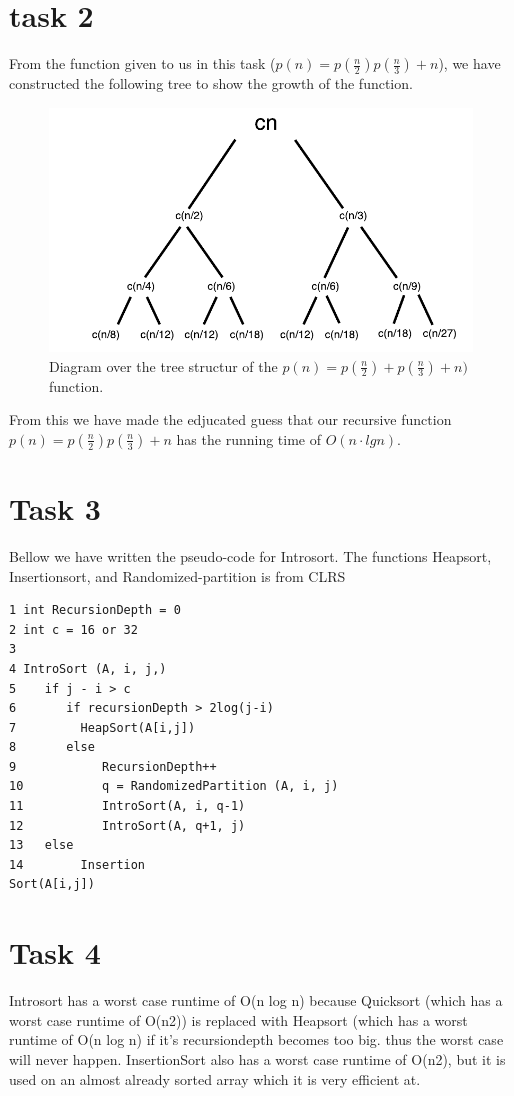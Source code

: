 \documentclass[12pt]{article}
\begin{document}
\section{task 2}
From the function given to us in this task ($p(n) = p(\frac{n}{2}) p(\frac{n}{3}) + n$), we have constructed the following tree to show the growth of the function.
\begin{figure}[!h]
 	\begin{center}
	\includegraphics[scale=1]{include/Tree_diagram}
	\end{center}
	\caption{Diagram over the tree structur of the $p(n) = p(\frac{n}{2}) + p(\frac{n}{3}) + n)$ function.}
	\label{Sekvens-user}
\end{figure}
From this we have made the edjucated guess that our recursive function $p(n) = p(\frac{n}{2}) p(\frac{n}{3}) + n $ has the running time of $O(n \cdot lgn)$.


\section{Task 3}
Bellow we have written the pseudo-code for Introsort. The functions Heapsort, Insertionsort, and Randomized-partition is from CLRS\\

\begin{verbatim}
1 int RecursionDepth = 0
2 int c = 16 or 32
3	
4 IntroSort (A, i, j,)
5    if j - i > c 
6       if recursionDepth > 2log(j-i)
7         HeapSort(A[i,j])
8       else 
9            RecursionDepth++
10           q = RandomizedPartition (A, i, j)
11           IntroSort(A, i, q-1)
12           IntroSort(A, q+1, j)
13   else 
14        Insertion
Sort(A[i,j])
\end{verbatim}
\section{Task 4}
Introsort has a worst case runtime of O(n log n) because Quicksort\cite{introduction-algorithms} (which has a worst case runtime of O(n2)) is replaced with Heapsort\cite{introduction-algorithms} (which has a worst runtime of O(n log n) if it's recursiondepth becomes too big. thus the worst case will never happen. 
InsertionSort\cite{introduction-algorithms} also has a worst case runtime of O(n2), but it is used on an almost already sorted array which it is very efficient at.
\end{document}
